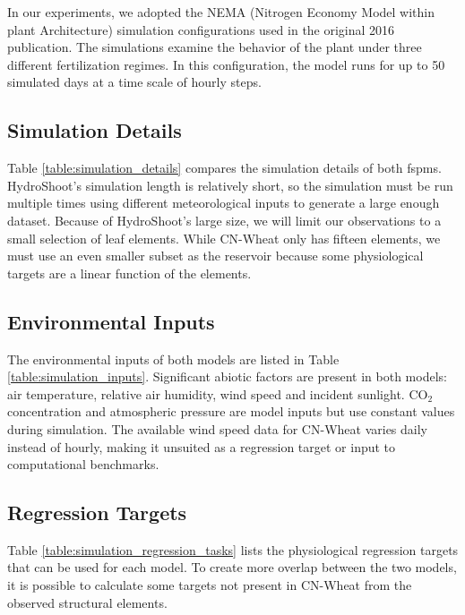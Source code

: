 In our experiments, we adopted the NEMA (Nitrogen Economy Model within plant Architecture) simulation configurations used in the original 2016 publication.
The simulations examine the behavior of the plant under three different fertilization regimes. 
In this configuration, the model runs for up to 50 simulated days at a time scale of hourly steps.



\subsection{Simulation Details}

Table \ref{table:simulation_details} compares the simulation details of both \acrshort{fspm}s.
HydroShoot's simulation length is relatively short, so the simulation must be run multiple times using different meteorological inputs to generate a large enough dataset.
Because of HydroShoot's large size, we will limit our observations to a small selection of leaf elements.
While CN-Wheat only has fifteen elements, we must use an even smaller subset as the reservoir because some physiological targets are a linear function of the elements. 



\subsection{Environmental Inputs}

The environmental inputs of both models are listed in Table \ref{table:simulation_inputs}.
Significant abiotic factors are present in both models: air temperature, relative air humidity, wind speed and incident sunlight.
CO$_2$ concentration and atmospheric pressure are model inputs but use constant values during simulation. 
The available wind speed data for CN-Wheat varies daily instead of hourly, making it unsuited as a regression target or input to computational benchmarks.

% 

\subsection{Regression Targets}

Table \ref{table:simulation_regression_tasks} lists the physiological regression targets that can be used for each model. 
To create more overlap between the two models, it is possible to calculate some targets not present in CN-Wheat from the observed structural elements.


